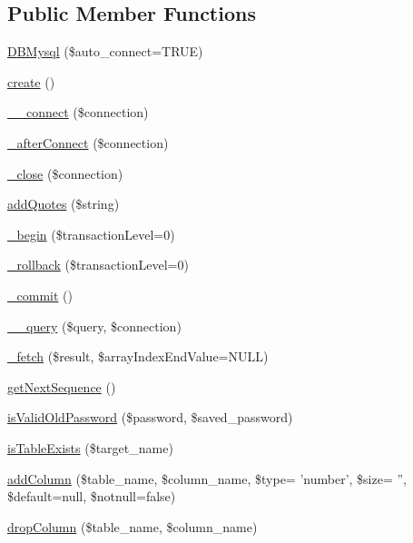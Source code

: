 \subsection*{Public Member Functions}
\begin{DoxyCompactItemize}
\item 
\hyperlink{classDBMysql_a8b17679c4439e5588d4322fe9b0e7439}{D\-B\-Mysql} (\$auto\-\_\-connect=T\-R\-U\-E)
\item 
\hyperlink{classDBMysql_a58ab5c56561966d486ba54129aed954d}{create} ()
\item 
\hyperlink{classDBMysql_ad11061c47d57c2f346947e0789ecb46b}{\-\_\-\-\_\-connect} (\$connection)
\item 
\hyperlink{classDBMysql_a660e94bc5cde26859bb95cc428ca92da}{\-\_\-after\-Connect} (\$connection)
\item 
\hyperlink{classDBMysql_a59581237e4dcb5f91f63de2459248e13}{\-\_\-close} (\$connection)
\item 
\hyperlink{classDBMysql_a9674193c36272fa9ea16c20d91cfbfe5}{add\-Quotes} (\$string)
\item 
\hyperlink{classDBMysql_a60dec65d2138fed25d0331e498972df8}{\-\_\-begin} (\$transaction\-Level=0)
\item 
\hyperlink{classDBMysql_af146dafdfc0dd7ce0f04427ac371a1ea}{\-\_\-rollback} (\$transaction\-Level=0)
\item 
\hyperlink{classDBMysql_a3f720677af37c36b2bc2934dd358a477}{\-\_\-commit} ()
\item 
\hyperlink{classDBMysql_aa33da673a8c415b641b4e0b5209d3453}{\-\_\-\-\_\-query} (\$query, \$connection)
\item 
\hyperlink{classDBMysql_a4c7d83d8dcbb8e65c8fdfe75fa7d9fa5}{\-\_\-fetch} (\$result, \$array\-Index\-End\-Value=N\-U\-L\-L)
\item 
\hyperlink{classDBMysql_a926ea6ca10e71ae128be90604b78411f}{get\-Next\-Sequence} ()
\item 
\hyperlink{classDBMysql_a19020f1ece293bcc332400234ee95dea}{is\-Valid\-Old\-Password} (\$password, \$saved\-\_\-password)
\item 
\hyperlink{classDBMysql_a095f2a64a070958c18cb3ebfab3043e5}{is\-Table\-Exists} (\$target\-\_\-name)
\item 
\hyperlink{classDBMysql_ab9f9ee7573485e7767c1dd7dd54cead0}{add\-Column} (\$table\-\_\-name, \$column\-\_\-name, \$type= 'number', \$size= '', \$default=null, \$notnull=false)
\item 
\hyperlink{classDBMysql_aa4cd80d663225f3cd7a539d7d7101b38}{drop\-Column} (\$table\-\_\-name, \$column\-\_\-name)

\end{DoxyCompactItemize}
